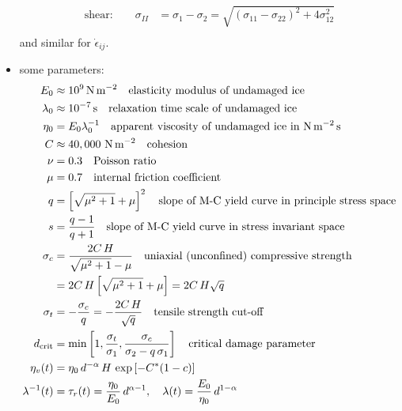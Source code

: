 \documentclass[12pt]{article}
\newcommand{\sr}{\dot{\epsilon}}
\begin{document}
\begin{itemize}
\begin{align}
    \text{shear:}\qquad\sigma_{II} &= \sigma_1-\sigma_2=
                                    \sqrt{(\sigma_{11}-\sigma_{22})^2+4\sigma_{12}^{2}}
                   \\
  \end{align}
  and similar for $\sr_{ij}$.
\item some parameters:
  \begin{alignat}{1}
    E_0&\approx 10^{9}\text{\,N\,m$^{-2}$}
    \quad\text{elasticity modulus of undamaged ice} \\
    \lambda_{0} &\approx 10^{-7}\text{\,s}
    \quad\text{relaxation time scale of undamaged ice} \\
    \eta_0&= E_0\lambda_{0}^{-1}
    \quad\text{apparent viscosity of undamaged ice in N\,m$^{-2}$\,s} \\
    C   &\approx 40,000\text{ N\,m$^{-2}$} \quad\text{cohesion}\\
    \nu &= 0.3 \quad\text{Poisson ratio}\\
    \mu &= 0.7 \quad\text{internal friction coefficient} \\
    q &= \left[\sqrt{\mu^{2}+1}+\mu\right]^{2}
    \quad\text{slope of M-C yield curve in principle stress space}\\
    s &= \frac{q-1}{q+1}
    \quad\text{slope of M-C yield curve in stress invariant space}\\
    \sigma_c &=\frac{2C\,H}{\sqrt{\mu^{2}+1}-\mu}
    \quad\text{uniaxial (unconfined) compressive strength}  \\
    &= 2C\,H\left[\sqrt{\mu^{2}+1}+\mu\right]
    =2C\,H\sqrt{q} \nonumber \\
    \sigma_t&=-\frac{\sigma_c}{q} = -\frac{2C\,H}{\sqrt{q}}
    \quad\text{tensile strength cut-off}\\
    d_{\mathrm{crit}} &= \min\left[1, \frac{\sigma_t}{\sigma_1},
      \frac{\sigma_c}{\sigma_2-q\,\sigma_1}\right]
    \quad\text{critical damage parameter} \\
    \eta_v(t) &= \eta_0\, d^{-\alpha}\,H\,\exp\left[-C^*(1-c)\right] \\
    \lambda^{-1}(t) &= \tau_r(t) = \frac{\eta_0}{E_0}\,d^{\alpha-1}, \quad
    \lambda(t) = \frac{E_0}{\eta_0}\,d^{1-\alpha}
  \end{alignat}


\end{itemize}
\end{document}
